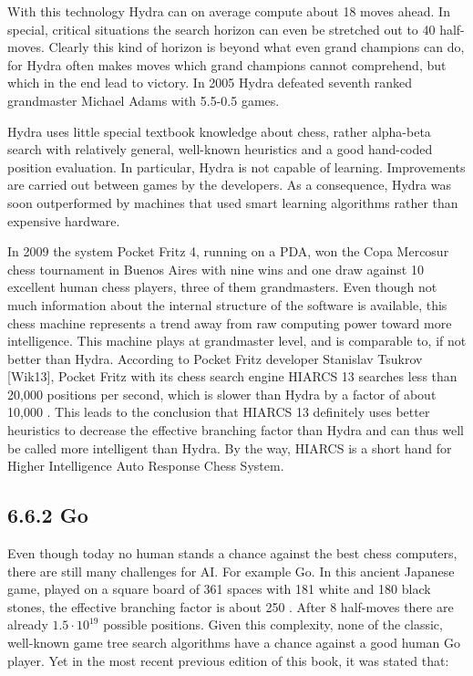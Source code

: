 \documentclass[10pt]{article}
\begin{document}
With this technology Hydra can on average compute about 18 moves ahead. In special, critical situations the search horizon can even be stretched out to 40 half-moves. Clearly this kind of horizon is beyond what even grand champions can do, for Hydra often makes moves which grand champions cannot comprehend, but which in the end lead to victory. In 2005 Hydra defeated seventh ranked grandmaster Michael Adams with 5.5-0.5 games.

Hydra uses little special textbook knowledge about chess, rather alpha-beta search with relatively general, well-known heuristics and a good hand-coded\\
position evaluation. In particular, Hydra is not capable of learning. Improvements are carried out between games by the developers. As a consequence, Hydra was soon outperformed by machines that used smart learning algorithms rather than expensive hardware.


In 2009 the system Pocket Fritz 4, running on a PDA, won the Copa Mercosur chess tournament in Buenos Aires with nine wins and one draw against 10 excellent human chess players, three of them grandmasters. Even though not much information about the internal structure of the software is available, this chess machine represents a trend away from raw computing power toward more intelligence. This machine plays at grandmaster level, and is comparable to, if not better than Hydra. According to Pocket Fritz developer Stanislav Tsukrov [Wik13], Pocket Fritz with its chess search engine HIARCS 13 searches less than 20,000 positions per second, which is slower than Hydra by a factor of about 10,000 . This leads to the conclusion that HIARCS 13 definitely uses better heuristics to decrease the effective branching factor than Hydra and can thus well be called more intelligent than Hydra. By the way, HIARCS is a short hand for Higher Intelligence Auto Response Chess System.

\subsection*{6.6.2 Go}
Even though today no human stands a chance against the best chess computers, there are still many challenges for AI. For example Go. In this ancient Japanese game, played on a square board of 361 spaces with 181 white and 180 black stones, the effective branching factor is about 250 . After 8 half-moves there are already $1.5 \cdot 10^{19}$ possible positions. Given this complexity, none of the classic, well-known game tree search algorithms have a chance against a good human Go player. Yet in the most recent previous edition of this book, it was stated that:
\end{document}
